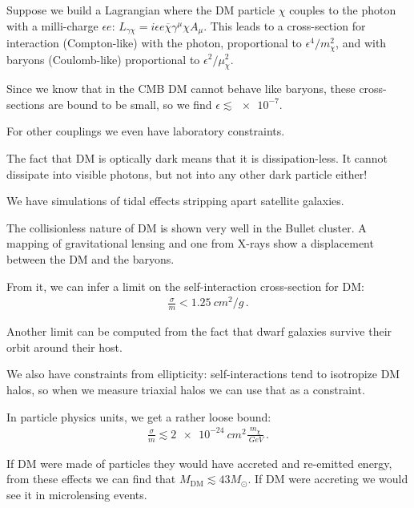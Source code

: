 \documentclass[main.tex]{subfiles}
\begin{document}
Suppose we build a Lagrangian where the DM particle \(\chi \) couples to the photon 
with a milli-charge \(\epsilon e\): \(L_{\gamma \chi } = i \epsilon e \overline{\chi} \gamma^\mu \chi A_\mu\). 
This leads to a cross-section for interaction (Compton-like) with the photon, proportional to \(\epsilon^4 / m_\chi^2\),
and with baryons (Coulomb-like) proportional to \(\epsilon^2 / \mu^2_\chi\). 

Since we know that in the CMB DM cannot behave like baryons, these cross-sections 
are bound to be small, so we find \(\epsilon \lesssim \num{e-7}\). 

For other couplings we even have laboratory constraints. 

The fact that DM is optically dark means that it is dissipation-less. 
It cannot dissipate into visible photons, but not into any other dark particle either! 

We have simulations of tidal effects stripping apart satellite galaxies.

The collisionless nature of DM is shown very well in the Bullet cluster.
A mapping of gravitational lensing and one from X-rays show a displacement
between the DM and the baryons. 


From it, we can infer a limit on the self-interaction cross-section for DM: 
%
\begin{align}
\frac{\sigma }{m} < \SI{1.25}{cm^2 / g}
\,.
\end{align}

Another limit can be computed from the fact that dwarf galaxies survive their
orbit around their host. 

We also have constraints from ellipticity: 
self-interactions tend to isotropize DM halos, so when we measure triaxial 
halos we can use that as a constraint. 

In particle physics units, we get a rather loose bound:
%
\begin{align}
\frac{\sigma}{m} \lesssim \SI{2e-24}{cm^2} \frac{m_\chi }{\SI{}{GeV}}
\,.
\end{align}

If DM were made of particles they would have accreted and re-emitted energy, 
from these effects we can find that \(M _{\text{DM}} \lesssim 43 M_{\odot}\). 
If DM were accreting we would see it in microlensing events. 
\end{document}
